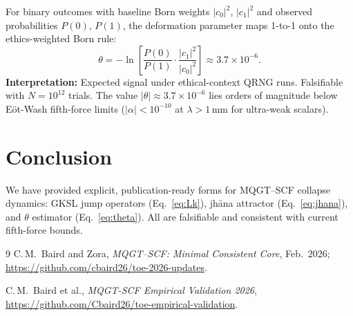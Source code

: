\documentclass[11pt]{article}
\theoremstyle{remark}
\begin{document}
For binary outcomes with baseline Born weights $|c_0|^2$, $|c_1|^2$ and observed probabilities $P(0)$, $P(1)$, the deformation parameter maps 1-to-1 onto the ethics-weighted Born rule:
\begin{equation}
\boxed{
\theta = -\ln\left[\frac{P(0)}{P(1)} \cdot \frac{|c_1|^2}{|c_0|^2}\right]
\approx 3.7 \times 10^{-6}.
}
\label{eq:theta}
\end{equation}
\textbf{Interpretation:} Expected signal under ethical-context QRNG runs. Falsifiable with $N = 10^{12}$ trials. The value $|\theta| \approx 3.7 \times 10^{-6}$ lies orders of magnitude below Eöt-Wash fifth-force limits ($|\alpha| < 10^{-10}$ at $\lambda > 1$\,mm for ultra-weak scalars).

\section{Conclusion}

We have provided explicit, publication-ready forms for MQGT--SCF collapse dynamics: GKSL jump operators (Eq.~\ref{eq:Lk}), jhāna attractor (Eq.~\ref{eq:jhana}), and $\theta$ estimator (Eq.~\ref{eq:theta}). All are falsifiable and consistent with current fifth-force bounds.

\begin{thebibliography}{9}
C.\,M.\ Baird and Zora, \emph{MQGT--SCF: Minimal Consistent Core}, Feb.\ 2026; \url{https://github.com/cbaird26/toe-2026-updates}.

C.\,M.\ Baird et al., \emph{MQGT-SCF Empirical Validation 2026}, \url{https://github.com/Cbaird26/toe-empirical-validation}.
\end{thebibliography}
\end{document}
